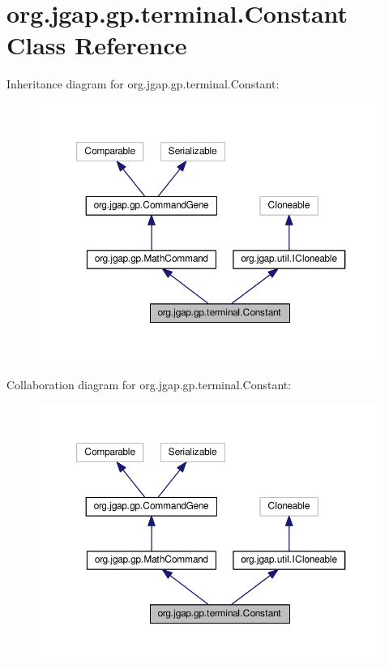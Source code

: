 \hypertarget{classorg_1_1jgap_1_1gp_1_1terminal_1_1_constant}{\section{org.\-jgap.\-gp.\-terminal.\-Constant Class Reference}
\label{classorg_1_1jgap_1_1gp_1_1terminal_1_1_constant}
}


Inheritance diagram for org.\-jgap.\-gp.\-terminal.\-Constant\-:
\nopagebreak
\begin{figure}[H]
\begin{center}
\leavevmode
\includegraphics[width=350pt]{classorg_1_1jgap_1_1gp_1_1terminal_1_1_constant__inherit__graph}
\end{center}
\end{figure}


Collaboration diagram for org.\-jgap.\-gp.\-terminal.\-Constant\-:
\nopagebreak
\begin{figure}[H]
\begin{center}
\leavevmode
\includegraphics[width=350pt]{classorg_1_1jgap_1_1gp_1_1terminal_1_1_constant__coll__graph}
\end{center}
\end{figure}
